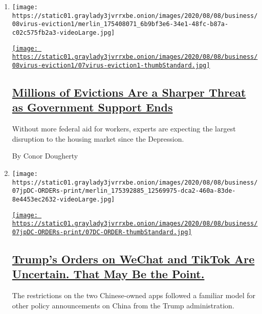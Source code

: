 \begin{enumerate}
\def\labelenumi{\arabic{enumi}.}
\item
  \texttt{[image: https://static01.graylady3jvrrxbe.onion/images/2020/08/08/business/08virus-eviction1/merlin\_175408071\_6b9bf3e6-34e1-48fc-b87a-c02c575fb2a3-videoLarge.jpg]}

  \href{/2020/08/07/business/economy/housing-economy-eviction-renters.html}{\texttt{[image: https://static01.graylady3jvrrxbe.onion/images/2020/08/08/business/08virus-eviction1/07virus-eviction1-thumbStandard.jpg]}}

  \hypertarget{millions-of-evictions-are-a-sharper-threat-as-government-support-ends}{%
  \subsection{\texorpdfstring{\href{/2020/08/07/business/economy/housing-economy-eviction-renters.html}{Millions
  of Evictions Are a Sharper Threat as Government Support
  Ends}}{Millions of Evictions Are a Sharper Threat as Government Support Ends}}\label{millions-of-evictions-are-a-sharper-threat-as-government-support-ends}}

  Without more federal aid for workers, experts are expecting the
  largest disruption to the housing market since the Depression.

  By Conor Dougherty
\item
  \texttt{[image: https://static01.graylady3jvrrxbe.onion/images/2020/08/08/business/07jpDC-ORDERs-print/merlin\_175392885\_12569975-dca2-460a-83de-8e4453ec2632-videoLarge.jpg]}

  \href{/2020/08/07/business/economy/trump-executive-order-tiktok-wechat.html}{\texttt{[image: https://static01.graylady3jvrrxbe.onion/images/2020/08/08/business/07jpDC-ORDERs-print/07DC-ORDER-thumbStandard.jpg]}}

  \hypertarget{trumps-orders-on-wechat-and-tiktok-are-uncertain-that-may-be-the-point}{%
  \subsection{\texorpdfstring{\href{/2020/08/07/business/economy/trump-executive-order-tiktok-wechat.html}{Trump's
  Orders on WeChat and TikTok Are Uncertain. That May Be the
  Point.}}{Trump's Orders on WeChat and TikTok Are Uncertain. That May Be the Point.}}\label{trumps-orders-on-wechat-and-tiktok-are-uncertain-that-may-be-the-point}}

  The restrictions on the two Chinese-owned apps followed a familiar
  model for other policy announcements on China from the Trump
  administration.


\end{enumerate}
